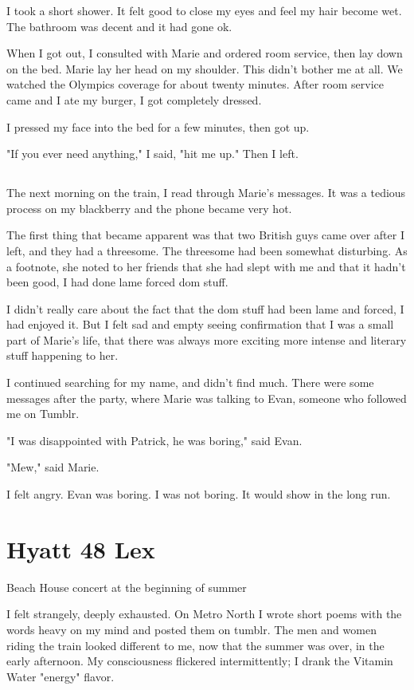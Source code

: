 \documentclass[12pt]{memoir}
\begin{document}
I took a short shower.  It felt good to close my eyes and feel my hair become
wet.  The bathroom was decent and it had gone ok.

When I got out, I consulted with Marie and ordered room service, then lay down
on the bed.  Marie lay her head on my shoulder.  This didn't bother me at all.
We watched the Olympics coverage for about twenty minutes.  After room service
came and I ate my burger, I got completely dressed.  

I pressed my face into the bed for a few minutes, then got up.

"If you ever need anything," I said, "hit me up."  Then I left.

\section{}

The next morning on the train, I read through Marie's messages.  It was a
tedious process on my blackberry and the phone became very hot. 

The first thing that became apparent was that two British guys came over
after I left, and they had a threesome.  The threesome had been somewhat
disturbing.  As a footnote, she noted to her friends that she had slept with me
and that it hadn't been good, I had done lame forced dom stuff.

I didn't really care about the fact that the dom stuff had been lame and forced,
I had enjoyed it.  But I felt sad and empty seeing confirmation that I was a small part of
Marie's life, that there was always more exciting more intense and literary
stuff happening to her.

I continued searching for my name, and didn't find much.  There were some
messages after the party, where Marie was talking to Evan, someone who followed
me on Tumblr.

"I was disappointed with Patrick, he was boring," said Evan.

"Mew," said Marie.

I felt angry.  Evan was boring.  I was not boring.  It would show in the long
run. 
            
\chapter{Hyatt 48 Lex}
Beach House concert at the beginning of summer

I felt strangely, deeply exhausted.  On Metro North I wrote short poems with the
words heavy on my mind and posted them on tumblr.  The men and women
riding the train looked different to me, now that the summer was over, 
in the early afternoon.  My consciousness flickered intermittently; 
I drank the Vitamin Water "energy" flavor.
\end{document}
